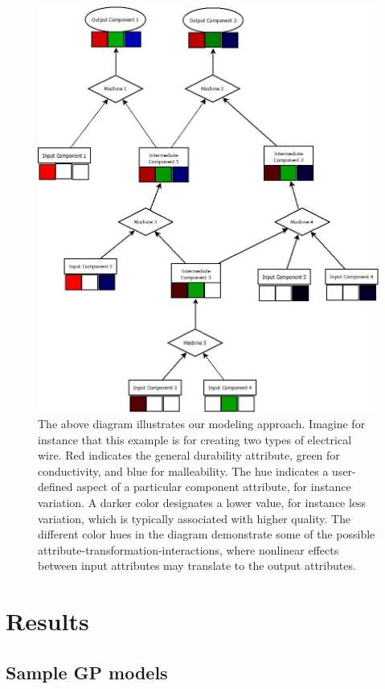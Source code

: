 \documentclass{IEEEtran}
\begin{document}
\begin{figure}[!t]
\centerline{\includegraphics[width=\columnwidth]{Diagram1.jpeg}}
\caption{The above diagram illustrates our modeling approach. Imagine for instance that this example is for creating two types of electrical wire. Red indicates the general durability attribute, green for conductivity, and blue for malleability. The hue indicates a user-defined aspect of a particular component attribute, for instance variation. A darker color designates a lower value, for instance less variation, which is typically associated with higher quality. The different color hues in the diagram demonstrate some of the possible attribute-transformation-interactions, where nonlinear effects between input attributes may translate to the output attributes.}
\label{fig1}
\end{figure}

\section{Results}

\subsection{Sample GP models}
\end{document}
